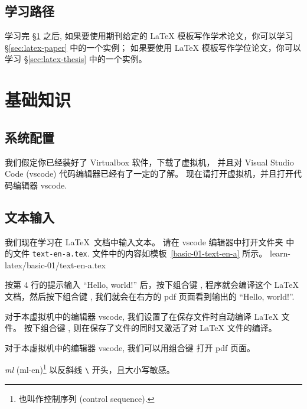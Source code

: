 \documentclass[
    11pt,
    base=hide,
    cite=authoryear,
    device=phone,
    lang=cn,
    mode=simple,
    result=answer,
    toc=onecol,
]{elegantbook_sierxue}
\begin{document}
\subsection*{学习路径}%
\label{sec:latex-learning}

学习完 \S\ref{sec:latex-basic} 之后,
如果要使用期刊给定的 \LaTeX{} 模板写作学术论文，你可以学习
\S\ref{sec:latex-paper} 中的一个实例；
如果要使用 \LaTeX{} 模板写作学位论文，你可以学习
\S\ref{sec:latex-thesis} 中的一个实例。

\section{基础知识}%
\label{sec:latex-basic}

\subsection*{系统配置}%
\label{sub:vm-vscode}

我们假定你已经装好了 Virtualbox 软件，下载了虚拟机，
并且对 Visual Studio Code (vscode) 代码编辑器已经有了一定的了解。
现在请打开虚拟机，并且打开代码编辑器 vscode.

\subsection{文本输入}%
\label{sub:latex-text}

我们现在学习在 \LaTeX\ 文档中输入文本。
请在 vscode 编辑器中打开文件夹 
中的文件 \texttt{text-en-a.tex}.
文件中的内容如模板~\ref{basic-01-text-en-a} 所示。
%
{learn-latex/basic-01/text-en-a.tex}

按第 4 行的提示输入 ``Hello, world!'' 后，按下组合键 ,
程序就会编译这个 {\LaTeX} 文档，然后按下组合键 ,
我们就会在右方的 pdf 页面看到输出的 ``Hello, world!''.
\begin{tip}\label{tip:vscode-shortcut-compile}
    对于本虚拟机中的编辑器 vscode,
    我们设置了在保存文件时自动编译 {\LaTeX} 文件。
    按下组合键 ,
    则在保存了文件的同时又激活了对 {\LaTeX} 文件的编译。
\end{tip}
\begin{tip}\label{tip:vscode-shortcut-pdfviewer}
    对于本虚拟机中的编辑器 vscode,
    我们可以用组合键  打开 pdf 页面。
\end{tip}
\begin{latex}\label{tex:command}
    \emph{\gls{ml}} (\gls{ml-en})\footnote{
        也叫作控制序列 (control sequence).}
    以反斜线 \texttt{\textbackslash}
    开头，且大小写敏感。
\end{latex}
\end{document}
